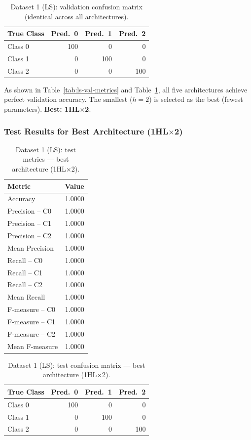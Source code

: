 \documentclass[11pt,a4paper]{article}
\begin{document}
\begin{table}[H]
\centering
\caption{Dataset 1 (LS): validation confusion matrix (identical across all architectures).}
\label{tab:ls-val-cm}
\begin{tabular}{lrrr}
\toprule
True Class & Pred.\ 0 & Pred.\ 1 & Pred.\ 2 \\
\midrule
Class 0 & 100 & 0 & 0 \\
Class 1 & 0   & 100 & 0 \\
Class 2 & 0   & 0 & 100 \\
\bottomrule
\end{tabular}
\end{table}

As shown in Table~\ref{tab:ls-val-metrics} and Table~\ref{tab:ls-val-cm}, all five architectures achieve perfect validation accuracy. The smallest ($h=2$) is selected as the best (fewest parameters). \textbf{Best: 1HL$\times$2}.

\subsubsection*{Test Results for Best Architecture (1HL$\times$2)}

\begin{table}[H]
\centering
\caption{Dataset 1 (LS): test metrics --- best architecture (1HL$\times$2).}
\label{tab:ls-test-metrics}
\begin{tabular}{lr}
\toprule
Metric & Value \\
\midrule
Accuracy        & 1.0000 \\
Precision -- C0 & 1.0000 \\
Precision -- C1 & 1.0000 \\
Precision -- C2 & 1.0000 \\
Mean Precision  & 1.0000 \\
Recall -- C0    & 1.0000 \\
Recall -- C1    & 1.0000 \\
Recall -- C2    & 1.0000 \\
Mean Recall     & 1.0000 \\
F-measure -- C0 & 1.0000 \\
F-measure -- C1 & 1.0000 \\
F-measure -- C2 & 1.0000 \\
Mean F-measure  & 1.0000 \\
\bottomrule
\end{tabular}
\end{table}

\begin{table}[H]
\centering
\caption{Dataset 1 (LS): test confusion matrix --- best architecture (1HL$\times$2).}
\label{tab:ls-test-cm}
\begin{tabular}{lrrr}
\toprule
True Class & Pred.\ 0 & Pred.\ 1 & Pred.\ 2 \\
\midrule
Class 0 & 100 & 0   & 0   \\
Class 1 & 0   & 100 & 0   \\
Class 2 & 0   & 0   & 100 \\
\bottomrule
\end{tabular}
\end{table}
\end{document}
